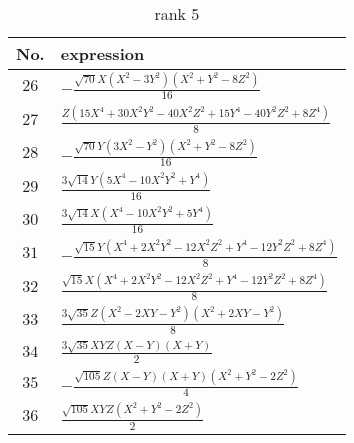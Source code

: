 \documentclass[fleqn,8pt,landscape]{jsarticle}
\begin{document}
\begin{table}[ht!]
\begin{center}
\caption{rank 5}
\renewcommand{\arraystretch}{1.3}
\begin{tabular}{cl} \hline \hline
No. & expression \\ \hline
$ 26 $ & $ - \frac{\sqrt{70} X \left(X^{2} - 3 Y^{2}\right) \left(X^{2} + Y^{2} - 8 Z^{2}\right)}{16} $ \\
$ 27 $ & $ \frac{Z \left(15 X^{4} + 30 X^{2} Y^{2} - 40 X^{2} Z^{2} + 15 Y^{4} - 40 Y^{2} Z^{2} + 8 Z^{4}\right)}{8} $ \\
$ 28 $ & $ - \frac{\sqrt{70} Y \left(3 X^{2} - Y^{2}\right) \left(X^{2} + Y^{2} - 8 Z^{2}\right)}{16} $ \\
$ 29 $ & $ \frac{3 \sqrt{14} Y \left(5 X^{4} - 10 X^{2} Y^{2} + Y^{4}\right)}{16} $ \\
$ 30 $ & $ \frac{3 \sqrt{14} X \left(X^{4} - 10 X^{2} Y^{2} + 5 Y^{4}\right)}{16} $ \\
$ 31 $ & $ - \frac{\sqrt{15} Y \left(X^{4} + 2 X^{2} Y^{2} - 12 X^{2} Z^{2} + Y^{4} - 12 Y^{2} Z^{2} + 8 Z^{4}\right)}{8} $ \\
$ 32 $ & $ \frac{\sqrt{15} X \left(X^{4} + 2 X^{2} Y^{2} - 12 X^{2} Z^{2} + Y^{4} - 12 Y^{2} Z^{2} + 8 Z^{4}\right)}{8} $ \\
$ 33 $ & $ \frac{3 \sqrt{35} Z \left(X^{2} - 2 X Y - Y^{2}\right) \left(X^{2} + 2 X Y - Y^{2}\right)}{8} $ \\
$ 34 $ & $ \frac{3 \sqrt{35} X Y Z \left(X - Y\right) \left(X + Y\right)}{2} $ \\
$ 35 $ & $ - \frac{\sqrt{105} Z \left(X - Y\right) \left(X + Y\right) \left(X^{2} + Y^{2} - 2 Z^{2}\right)}{4} $ \\
$ 36 $ & $ \frac{\sqrt{105} X Y Z \left(X^{2} + Y^{2} - 2 Z^{2}\right)}{2} $ \\
 \hline \hline
\end{tabular}
\end{center}
\end{table}
\end{document}
